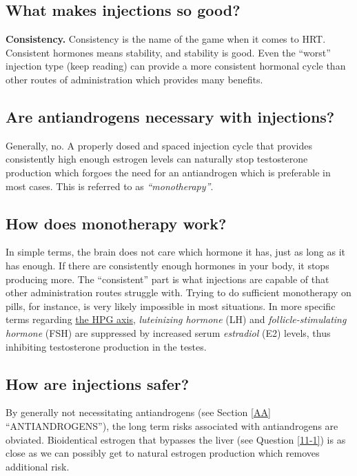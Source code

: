 \documentclass{article}
\begin{document}
\subsection{What makes injections so good?}

\textbf{Consistency.} Consistency is the name of the game when it comes to HRT. Consistent hormones means stability, and stability is good. Even the “worst” injection type (keep reading) can provide a more consistent hormonal cycle than other routes of administration which provides many benefits.

\subsection{Are antiandrogens necessary with injections?}

Generally, no. A properly dosed and spaced injection cycle that provides consistently high enough estrogen levels can naturally stop testosterone production which forgoes the need for an antiandrogen which is preferable in most cases. This is referred to as \textit{“monotherapy”}.

\subsection{How does monotherapy work?}\label{2-3}

In simple terms, the brain does not care which hormone it has, just as long as it has enough. If there are consistently enough hormones in your body, it stops producing more. The “consistent” part is what injections are capable of that other administration routes struggle with. Trying to do sufficient monotherapy on pills, for instance, is very likely impossible in most situations. In more specific terms regarding \href{https://en.wikipedia.org/wiki/Hypothalamic-pituitary-gonadal_axis}{the HPG axis}, \textit{luteinizing hormone} (LH) and \textit{follicle-stimulating hormone} (FSH) are suppressed by increased serum \textit{estradiol} (E2) levels, thus inhibiting testosterone production in the testes.

\subsection{How are injections safer?}

By generally not necessitating antiandrogens (see Section \ref{AA} “ANTIANDROGENS”), the long term risks associated with antiandrogens are obviated. Bioidentical estrogen that bypasses the liver (see Question \ref{11-1}) is as close as we can possibly get to natural estrogen production which removes additional risk.
\end{document}
